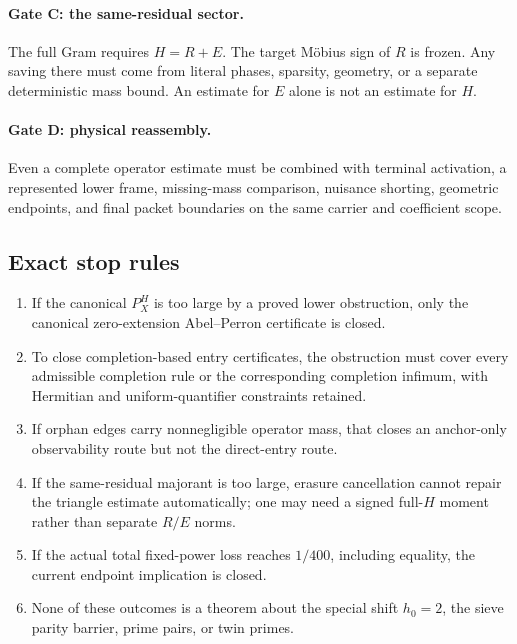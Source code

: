 \paragraph{Gate C: the same-residual sector.}
The full Gram requires \(H=R+E\).  The target M\"obius sign of \(R\) is
frozen.  Any saving there must come from literal phases, sparsity,
geometry, or a separate deterministic mass bound.  An estimate for \(E\)
alone is not an estimate for \(H\).

\paragraph{Gate D: physical reassembly.}
Even a complete operator estimate must be combined with terminal
activation, a represented lower frame, missing-mass comparison, nuisance
shorting, geometric endpoints, and final packet boundaries on the same
carrier and coefficient scope.

\subsection{Exact stop rules}

\begin{enumerate}[label=\textup{(G\arabic*)},leftmargin=3.2em]
 \item If the canonical \(P_X^H\) is too large by a proved lower
       obstruction, only the canonical zero-extension Abel--Perron
       certificate is closed.
 \item To close completion-based entry certificates, the obstruction must
       cover every admissible completion rule or the corresponding
       completion infimum, with Hermitian and uniform-quantifier
       constraints retained.
 \item If orphan edges carry nonnegligible operator mass, that closes an
       anchor-only observability route but not the direct-entry route.
 \item If the same-residual majorant is too large, erasure cancellation
       cannot repair the triangle estimate automatically; one may need a
       signed full-\(H\) moment rather than separate \(R/E\) norms.
 \item If the actual total fixed-power loss reaches \(1/400\), including
       equality, the current endpoint implication is closed.
 \item None of these outcomes is a theorem about the special shift
       \(h_0=2\), the sieve parity barrier, prime pairs, or twin primes.
\end{enumerate}

